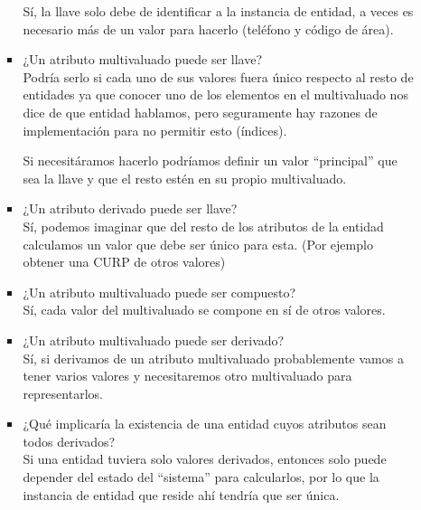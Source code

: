 \documentclass[12pt,a4paper]{article}
\begin{document}
\begin{enumerate}
\begin{enumerate}
\begin{itemize}
						Sí, la llave solo debe de identificar a la instancia de entidad,
						a veces es necesario más de un valor para hacerlo (teléfono y código de área).

					\item ¿Un atributo multivaluado puede ser llave?\\

						Podría serlo si cada uno de sus valores fuera único respecto
						al resto de entidades ya que conocer uno de los elementos
						en el multivaluado nos dice de que entidad hablamos,
						pero seguramente hay razones
						de implementación para no permitir esto (índices).

						Si necesitáramos hacerlo podríamos definir un valor ``principal''
						que sea la llave y que el resto estén en su propio multivaluado.\\

					\item ¿Un atributo derivado puede ser llave?\\

						Sí, podemos imaginar que del resto de los atributos
						de la entidad calculamos un valor que debe ser único
						para esta. (Por ejemplo obtener una CURP de otros valores)\\

					\item ¿Un atributo multivaluado puede ser compuesto?\\

						Sí, cada valor del multivaluado se compone en sí
						de otros valores. \\

					\item ¿Un atributo multivaluado puede ser derivado?\\

						Sí, si derivamos de un atributo multivaluado probablemente
						vamos a tener varios valores y necesitaremos otro multivaluado
						para representarlos.\\

					\item ¿Qué implicaría la existencia de una entidad cuyos atributos sean todos derivados?\\

						Si una entidad tuviera solo valores derivados, entonces solo puede depender
						del estado del ``sistema'' para calcularlos, por lo que
						la instancia de entidad que reside ahí tendría que ser única.\\
				\end{itemize}


\end{enumerate}
\end{enumerate}
\end{document}
